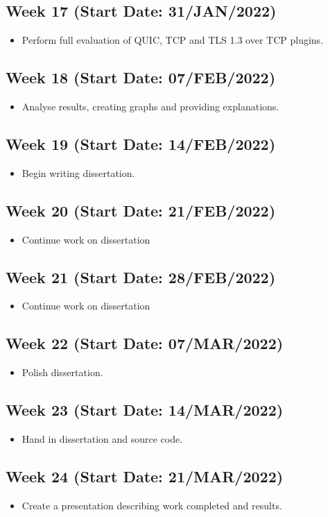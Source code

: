 \documentclass[11pt]{article}
\begin{document}
\subsection{Week 17 (Start Date: 31/JAN/2022)}
\begin{itemize}
    \item Perform full evaluation of QUIC, TCP and TLS 1.3 over TCP plugins.
\end{itemize}
\subsection{Week 18 (Start Date: 07/FEB/2022)}
\begin{itemize}
    \item Analyse results, creating graphs and providing explanations.
\end{itemize}
\subsection{Week 19 (Start Date: 14/FEB/2022)}
\begin{itemize}
    \item Begin writing dissertation.
\end{itemize}
\subsection{Week 20 (Start Date: 21/FEB/2022)}
\begin{itemize}
    \item Continue work on dissertation
\end{itemize}
\subsection{Week 21 (Start Date: 28/FEB/2022)}
\begin{itemize}
    \item Continue work on dissertation
\end{itemize}
\subsection{Week 22 (Start Date: 07/MAR/2022)}
\begin{itemize}
    \item Polish dissertation.
\end{itemize}
\subsection{Week 23 (Start Date: 14/MAR/2022)}
\begin{itemize}
    \item Hand in dissertation and source code.
\end{itemize}
\subsection{Week 24 (Start Date: 21/MAR/2022)}
\begin{itemize}
    \item Create a presentation describing work completed and results.
\end{itemize}





\end{document}
